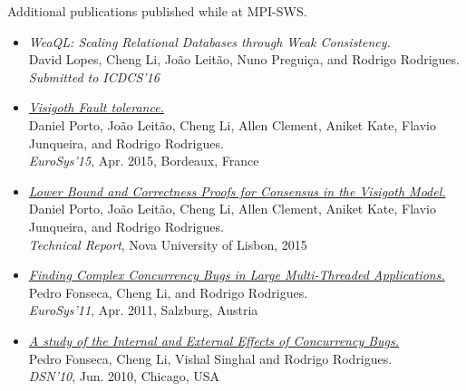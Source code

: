 \clearpage
{\Large Additional publications published while at MPI-SWS.}
\begin{center}
\begin{itemize}
 \item {\em WeaQL: Scaling Relational Databases through Weak Consistency.}\\
  David Lopes, Cheng Li, Jo{\~a}o Leit{\~ a}o, Nuno Pregui{\c c}a, and Rodrigo Rodrigues.\\
  \emph{Submitted to ICDCS'16}
 \item \href{http://dl.acm.org/citation.cfm?id=2741979}{{\em Visigoth Fault tolerance.}}\\
  Daniel Porto, Jo{\~a}o Leit{\~ a}o, Cheng Li, Allen Clement, Aniket Kate, Flavio Junqueira, and Rodrigo Rodrigues.\\
 \emph{EuroSys'15}, Apr. 2015, Bordeaux, France
  \item \href{http://www.mpi-sws.org/~dcfp/files/vftTR.pdf}{{\em  Lower Bound and Correctness Proofs for Consensus in the Visigoth Model.}}\\
  Daniel Porto, Jo{\~a}o Leit{\~ a}o, Cheng Li, Allen Clement, Aniket Kate, Flavio Junqueira, and Rodrigo Rodrigues.\\
  \emph{Technical Report}, Nova University of Lisbon, 2015
 \item \href{http://dl.acm.org/citation.cfm?id=1966465}{{\em Finding Complex Concurrency Bugs in Large Multi-Threaded Applications.}}\\
 Pedro Fonseca, Cheng Li, and Rodrigo Rodrigues.\\
 \emph{EuroSys'11}, Apr. 2011, Salzburg, Austria
 \item \href{http://www.mpi-sws.org/~rodrigo/dsn2010-concurrencybugs.pdf}{{\em A study of the Internal and External Effects of Concurrency Bugs.}}\\
 Pedro Fonseca, Cheng Li, Vishal Singhal and Rodrigo Rodrigues.\\
 \emph{DSN'10}, Jun. 2010, Chicago, USA
\end{itemize}
\end{center}


